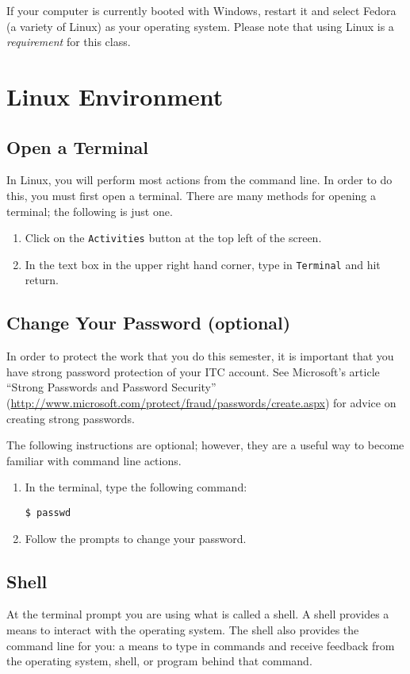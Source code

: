 \documentclass[11pt]{cselabheader}
\begin{document}
If your computer is currently booted with Windows, restart it and select Fedora
(a variety of Linux) as your operating system. Please note that using Linux is a
\emph{requirement} for this class.

\section{Linux Environment}
\label{sec:linux}

\subsection{Open a Terminal}
In Linux, you will perform most actions from the command line. In order to do
this, you must first open a terminal. There are many methods for opening a
terminal; the following is just one.

\begin{enumerate}
  \item Click on the \texttt{Activities} button at the top left of the screen.
  \item In the text box in the upper right hand corner, type in
    \texttt{Terminal} and hit return.
\end{enumerate}

\subsection{Change Your Password (optional)}
In order to protect the work that you do this semester, it is important that you
have strong password protection of your ITC account.  See Microsoft's article
``Strong Passwords and Password Security''
(\url{http://www.microsoft.com/protect/fraud/passwords/create.aspx}) for advice
on creating strong passwords.

The following instructions are optional; however, they are a useful way to
become familiar with command line actions.

\begin{enumerate}
  \item In the terminal, type the following command:
    \begin{lstlisting}[style=bash]
$ passwd
    \end{lstlisting}
  \item Follow the prompts to change your password.
\end{enumerate}

\subsection{Shell}
At the terminal prompt you are using what is called a shell. A shell
provides a means to interact with the operating system. The shell also provides
the command line for you: a means to type in commands and receive feedback from
the operating system, shell, or program behind that command.
\end{document}

